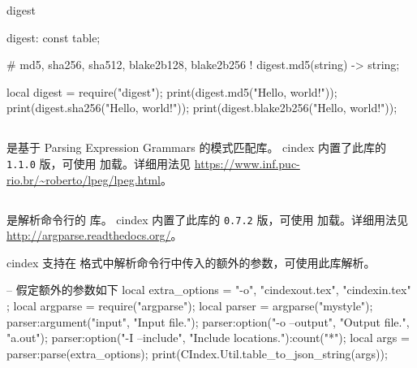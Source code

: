 \documentclass[class=article,doc={kv-usage}]{cusdoc}
\newcommand*\LUA{\texorpdfstring{\textcon{lua}}{lua}}
\begin{document}
\begin{luadoc}[global]{digest}
  \begin{luasyntax}
    digest: const table;
  \end{luasyntax}
\end{luadoc}

\begin{luadoc*}{}
# md5, sha256, sha512, blake2b128, blake2b256
! digest.md5(string) -> string;
\end{luadoc*}

\begin{luarun}{}
local digest = require("digest");
print(digest.md5("Hello, world!"));
print(digest.sha256("Hello, world!"));
print(digest.blake2b256("Hello, world!"));
\end{luarun}

\subsection{}

\href{https://www.inf.puc-rio.br/~roberto/lpeg/lpeg.html}{} 是基于 Parsing Expression Grammars 的模式匹配库。
cindex 内置了此库的 \texttt{1.1.0} 版，可使用  加载。详细用法见 \url{https://www.inf.puc-rio.br/~roberto/lpeg/lpeg.html}。

\subsection{}

\href{https://github.com/luarocks/argparse/blob/master}{} 是解析命令行的 \LUA 库。
cindex 内置了此库的 \texttt{0.7.2} 版，可使用  加载。详细用法见 \url{http://argparse.readthedocs.org/}。

cindex 支持在 \LUA 格式中解析命令行中传入的额外的参数，可使用此库解析。

\begin{luarun}{}
-- 假定额外的参数如下
local extra_options = { "-o", "cindexout.tex", "cindexin.tex" };
local argparse = require("argparse");
local parser = argparse("mystyle");
parser:argument("input", "Input file.");
parser:option("-o --output", "Output file.", "a.out");
parser:option("-I --include", "Include locations."):count("*");
local args = parser:parse(extra_options);
print(CIndex.Util.table_to_json_string(args));
\end{luarun}

\printindex[docusage,multi={ragged,sep=1em,outer-skip=0pt,cols=2}]
\end{document}
